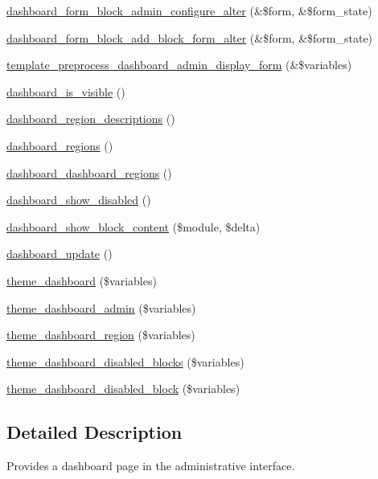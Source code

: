 \begin{DoxyCompactItemize}
\item 
\hyperlink{dashboard_8module_abc9f64b9c3b100c4e0e4450cc8c50bf0}{dashboard\_\-form\_\-block\_\-admin\_\-configure\_\-alter} (\&\$form, \&\$form\_\-state)
\item 
\hyperlink{dashboard_8module_a36ed992fdf3f66ca72b06a219ff42100}{dashboard\_\-form\_\-block\_\-add\_\-block\_\-form\_\-alter} (\&\$form, \&\$form\_\-state)
\item 
\hyperlink{dashboard_8module_addaee36bd5501ed3c8fbefa12a866f22}{template\_\-preprocess\_\-dashboard\_\-admin\_\-display\_\-form} (\&\$variables)
\item 
\hyperlink{dashboard_8module_ac63a42b45d92441592f7945f320cbd52}{dashboard\_\-is\_\-visible} ()
\item 
\hyperlink{dashboard_8module_a23d85f4c4aadbcc16a39bc7267689dea}{dashboard\_\-region\_\-descriptions} ()
\item 
\hyperlink{dashboard_8module_aa1609a0c67095a8c58a242d2a7e470bd}{dashboard\_\-regions} ()
\item 
\hyperlink{dashboard_8module_ad0e0798be026863f02c9b4e316fc1286}{dashboard\_\-dashboard\_\-regions} ()
\item 
\hyperlink{dashboard_8module_a4daa6ec664ef4e666918635c4fcb2002}{dashboard\_\-show\_\-disabled} ()
\item 
\hyperlink{dashboard_8module_a801487bbf9658e337fe3b1b434979420}{dashboard\_\-show\_\-block\_\-content} (\$module, \$delta)
\item 
\hyperlink{dashboard_8module_a9e4047a9a86d0c8ae438a3f4e61c9a81}{dashboard\_\-update} ()
\item 
\hyperlink{group__themeable_ga6c02d8ffcbb05e9a3b8a6159588ea756}{theme\_\-dashboard} (\$variables)
\item 
\hyperlink{group__themeable_gaa23f321cda9a9681189b56dde889c5be}{theme\_\-dashboard\_\-admin} (\$variables)
\item 
\hyperlink{group__themeable_ga2f5b5b4f1677e2768387c88b6532164c}{theme\_\-dashboard\_\-region} (\$variables)
\item 
\hyperlink{group__themeable_ga8ac4d0963e51b469850301e4c1e85cb6}{theme\_\-dashboard\_\-disabled\_\-blocks} (\$variables)
\item 
\hyperlink{group__themeable_ga4a956aaf4c079a8d60542ed1ad9f3b9e}{theme\_\-dashboard\_\-disabled\_\-block} (\$variables)
\end{DoxyCompactItemize}


\subsection{Detailed Description}
Provides a dashboard page in the administrative interface. 

